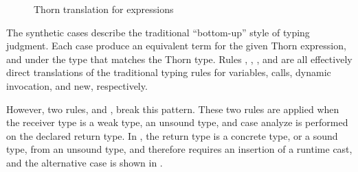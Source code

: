 \documentclass[a4paper,USenglish]{tex/lipics-v2016}
\begin{document}
\begin{figure}
\begin{mathpar}





\end{mathpar}
\caption{Thorn translation for expressions}
\label{fig:thorntrans_exp}
\end{figure}

The synthetic cases describe the traditional ``bottom-up'' style of typing
judgment. Each case produce an equivalent  \kafka term for the given Thorn
expression, and under the \kafka type that matches the Thorn type. Rules
, , , and  are all
effectively  direct translations of the traditional typing rules for variables,
calls, dynamic invocation, and new, respectively.

However, two rules,  and , break this pattern. These
two rules are applied when the receiver type is a weak type, an unsound type,
and case analyze is performed on the declared return type. In ,
the return type is a concrete type, or a sound type,  from an unsound type, and
therefore requires an insertion of a runtime cast, and the alternative case is
shown in .
\end{document}
